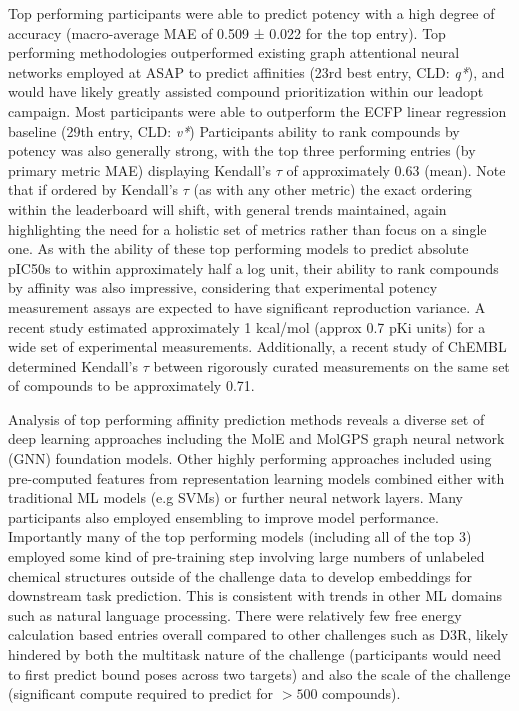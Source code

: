 \documentclass[journal=jcim,manuscript=article]{achemso}
\begin{document}
Top performing participants were able to predict potency with a high degree of accuracy (macro-average MAE of 0.509 ± 0.022 for the top entry). Top performing methodologies outperformed existing graph attentional neural networks employed at ASAP to predict affinities (23rd best entry, CLD: \textit{q*}), and would have likely greatly assisted compound prioritization within our leadopt campaign. Most participants were able to outperform the ECFP linear regression baseline (29th entry, CLD: \textit{v*}) Participants ability to rank compounds by potency was also generally strong, with the top three performing entries (by primary metric MAE) displaying Kendall's $\tau$ of approximately 0.63 (mean). Note that if ordered by Kendall's $\tau$ (as with any other metric) the exact ordering within the leaderboard will shift, with general trends maintained, again highlighting the need for a holistic set of metrics rather than focus on a single one. As with the ability of these top performing models to predict absolute pIC50s to within approximately half a log unit, their ability to rank compounds by affinity was also impressive, considering that experimental potency measurement assays are expected to have significant reproduction variance. A recent study estimated approximately 1 kcal/mol (approx 0.7 pKi units)\cite{ross_maximal_2023} for a wide set of experimental measurements. Additionally, a recent study of ChEMBL\cite{landrum_combining_2024} determined Kendall's $\tau$ between rigorously curated measurements on the same set of compounds to be approximately 0.71.

Analysis of top performing affinity prediction methods reveals a diverse set of deep learning approaches including the MolE\cite{mendez-lucio_mole_2024} and MolGPS\cite{sypetkowski2024scalabilitygnnsmoleculargraphs} graph neural network (GNN) foundation models. Other highly performing approaches included using pre-computed features from representation learning models combined either with traditional ML models (e.g SVMs) or further neural network layers. Many participants also employed ensembling to improve model performance.  Importantly many of the top performing models (including all of the top 3) employed some kind of pre-training step involving large numbers of unlabeled chemical structures outside of the challenge data to develop embeddings for downstream task prediction. This is consistent with trends in other ML domains such as natural language processing\cite{radford2019language}. There were relatively few free energy calculation based entries overall compared to other challenges such as D3R\cite{parks_gaieb_chiu_yang_shao_walters_jansen_mcgaughey_lewis_bembenek_et}, likely hindered by both the multitask nature of the challenge (participants would need to first predict bound poses across two targets) and also the scale of the challenge (significant compute required to predict for $>500$ compounds).
\end{document}
